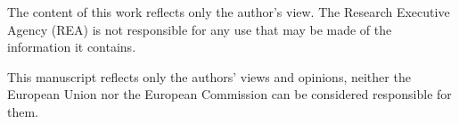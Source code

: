 The content of this work reflects only the author's view. The Research Executive Agency (REA) is not responsible for any use that may be made of the information it contains. 

This manuscript reflects only the authors’ views and opinions, neither the European Union nor the European Commission can be considered responsible for them.